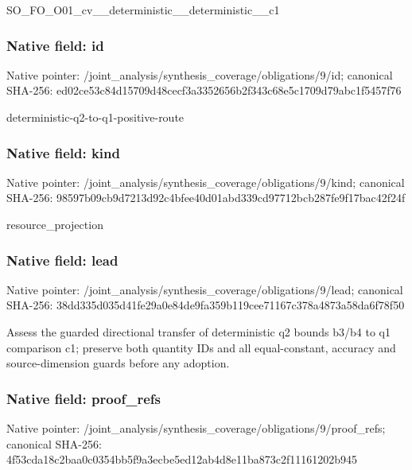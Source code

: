\documentclass[10pt,a4paper]{article}
\begin{document}
\begingroup\raggedright\sloppy SO\_\allowbreak{}FO\_\allowbreak{}O01\_\allowbreak{}cv\_\allowbreak{}\_\allowbreak{}deterministic\_\allowbreak{}\_\allowbreak{}deterministic\_\allowbreak{}\_\allowbreak{}c1\par\endgroup

\subsubsection{Native field: id}
Native pointer: /joint\_\allowbreak{}analysis/synthesis\_\allowbreak{}coverage/obligations/9/id; canonical SHA-256: ed02ce53c84d15709d48cecf3a3352656b2f343c68e5c1709d79abc1f5457f76

\begingroup\raggedright\sloppy deterministic-q2-to-q1-positive-route\par\endgroup

\subsubsection{Native field: kind}
Native pointer: /joint\_\allowbreak{}analysis/synthesis\_\allowbreak{}coverage/obligations/9/kind; canonical SHA-256: 98597b09cb9d7213d92c4bfee40d01abd339cd97712bcb287fe9f17bac42f24f

\begingroup\raggedright\sloppy resource\_\allowbreak{}projection\par\endgroup

\subsubsection{Native field: lead}
Native pointer: /joint\_\allowbreak{}analysis/synthesis\_\allowbreak{}coverage/obligations/9/lead; canonical SHA-256: 38dd335d035d41fe29a0e84de9fa359b119cee71167c378a4873a58da6f78f50

\begingroup\raggedright\sloppy Assess the guarded directional transfer of deterministic q2 bounds b3/\allowbreak{}b4 to q1 comparison c1;\allowbreak{} preserve both quantity IDs and all equal-constant,\allowbreak{} accuracy and source-dimension guards before any adoption.\par\endgroup

\subsubsection{Native field: proof\_\allowbreak{}refs}
Native pointer: /joint\_\allowbreak{}analysis/synthesis\_\allowbreak{}coverage/obligations/9/proof\_\allowbreak{}refs; canonical SHA-256: 4f53cda18c2baa0c0354bb5f9a3ecbe5ed12ab4d8e11ba873c2f11161202b945
\end{document}
